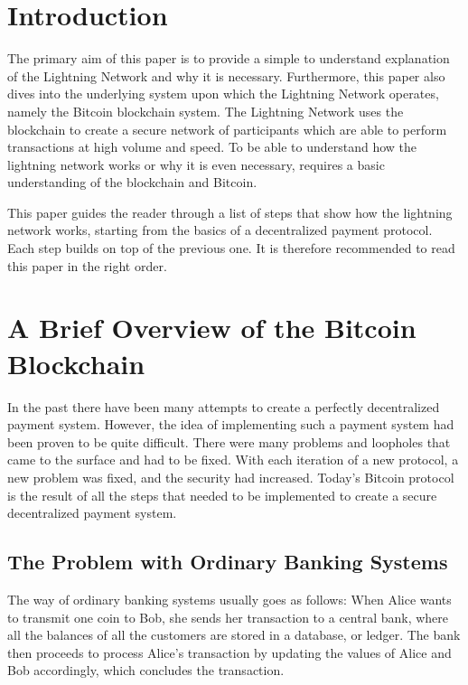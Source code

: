 \documentclass[a4paper, 12pt]{report}
\begin{document}

\chapter{Introduction}

\par The primary aim of this paper is to provide a simple to understand explanation of the Lightning Network and why it is necessary. Furthermore, this paper also dives into the underlying system upon which the Lightning Network operates, namely the Bitcoin blockchain system. The Lightning Network uses the blockchain to create a secure network of participants which are able to perform transactions at high volume and speed. To be able to understand how the lightning network works or why it is even necessary, requires a basic understanding of the blockchain and Bitcoin.

\par This paper guides the reader through a list of steps that show how the lightning network works, starting from the basics of a decentralized payment protocol. Each step builds on top of the previous one. It is therefore recommended to read this paper in the right order.

\chapter{A Brief Overview of the Bitcoin Blockchain}

\par In the past there have been many attempts to create a perfectly decentralized payment system. However, the idea of implementing such a payment system had been proven to be quite difficult. There were many problems and loopholes that came to the surface and had to be fixed. With each iteration of a new protocol, a new problem was fixed, and the security had increased. Today’s Bitcoin protocol is the result of all the steps that needed to be implemented to create a secure decentralized payment system.

\section{The Problem with Ordinary Banking Systems}

\par The way of ordinary banking systems usually goes as follows: When Alice wants to transmit one coin to Bob, she sends her transaction to a central bank, where all the balances of all the customers are stored in a database, or ledger. The bank then proceeds to process Alice’s transaction by updating the values of Alice and Bob accordingly, which concludes the transaction. 
\end{document}
